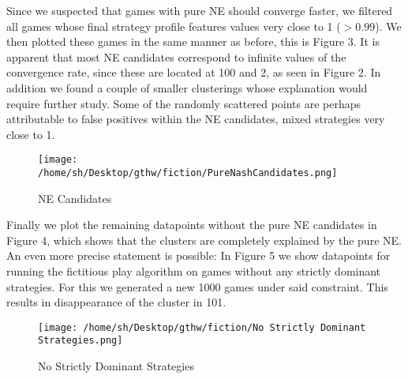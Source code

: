 \documentclass[10pt,a4paper]{article}
\begin{document}
Since we suspected that games with pure NE should converge faster, we filtered all games whose final strategy profile features values very close to 1 ($>0.99$). We then plotted these games in the same manner as before, this is Figure 3. It is apparent that most NE candidates correspond to infinite values of the convergence rate, since these are located at 100 and 2, as seen in Figure 2. In addition we found a couple of smaller clusterings whose explanation would require further study. Some of the randomly scattered points are perhaps attributable to false positives within the NE candidates, mixed strategies very close to 1.
\begin{figure}
  \texttt{[image: /home/sh/Desktop/gthw/fiction/PureNashCandidates.png]}
  \caption{NE Candidates}
  \label{fig:Pure NE}
\end{figure}
Finally we plot the remaining datapoints without the pure NE candidates in Figure 4, which shows that the clusters are completely explained by the pure NE. An even more precise statement is possible: In Figure 5 we show datapoints for running the fictitious play algorithm on games without any strictly dominant strategies. For this we generated a new 1000 games under said constraint. This results in disappearance of the cluster in 101.

\begin{figure}
  \texttt{[image: /home/sh/Desktop/gthw/fiction/No Strictly Dominant Strategies.png]}
  \caption{No Strictly Dominant Strategies}
  \label{fig:boat1}
\end{figure}
\end{document}
